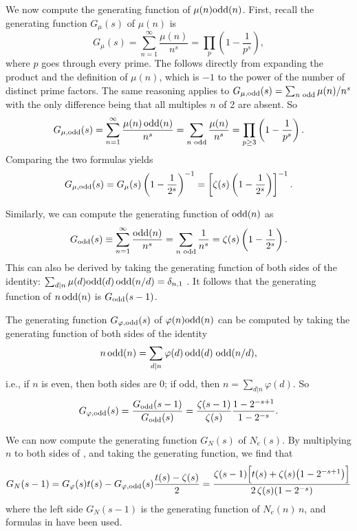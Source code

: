 \documentclass[preprint]{revtex4-1}
\begin{document}
We now compute the generating function of $\mu(n)\mathrm{odd}(n)$.
First, recall the generating function $G_\mu(s)$ of $\mu(n)$ is
\[
  G_\mu(s) = \sum_{n=1}^{\infty} \frac{\mu(n)}{n^s}
  = \prod_p \left( 1 - \frac{1}{p^s} \right),
\]
where $p$ goes through every prime.
%
The follows directly from expanding the product
  and the definition of $\mu(n)$,
which is $-1$ to the power of the number of distinct prime factors.
%
The same reasoning applies to
$G_{\mu, \mathrm{odd}}(s) = \sum_{n \text{ odd}} \mu(n)/n^s$
with the only difference being that all multiples $n$ of 2
are absent. So
%
\[
  G_{\mu, \mathrm{odd}}(s)
  = \sum_{n=1}^{\infty} \frac{\mu(n) \, \mathrm{odd}(n)}{n^s}
  = \sum_{n \text{ odd}} \frac{\mu(n)}{n^s}
  = \prod_{p \ge 3} \left( 1 - \frac{1}{p^s} \right).
\]
Comparing the two formulas yields
\[
  G_{\mu, \mathrm{odd}}(s)
  = G_{\mu}(s)
  \left(1- \frac{1}{2^s}\right)^{-1}
  =
   \left[ \zeta(s) \left(1- \frac{1}{2^s}\right) \right]^{-1}.
\]



Similarly,
we can compute the generating function of $\mathrm{odd}(n)$ as
\[
  G_{\mathrm{odd}}(s)
  \equiv \sum_{n=1}^{\infty} \frac{\mathrm{odd}(n)}{n^s}
  = \sum_{n \text{ odd}} \frac{1}{n^s}
  = \zeta(s) \left(1 - \frac{1}{2^s} \right).
\]
This can also be derived by taking the generating function of
both sides of the identity:
$\sum_{d|n} \mu(d) \mathrm{odd}(d) \, \mathrm{odd}(n/d) = \delta_{n, 1}$
\big[which is a modification of
$\sum_{d|n} \mu(d) = \delta_{n, 1}$\big].
%
It follows that the generating function of $n \, \mathrm{odd}(n)$ is $G_{\mathrm{odd}}(s-1)$.



The generating function $G_{\varphi,\mathrm{odd}}(s)$
of $\varphi(n) \mathrm{odd}(n)$ can be computed by taking the generating function
of both sides of the identity
\[
  n \, \mathrm{odd}(n)  = \sum_{d|n} \varphi(d) \, \mathrm{odd}(d) \; \mathrm{odd}(n/d),
\]
i.e., if $n$ is even, then both sides are 0;
if odd, then $n = \sum_{d|n} \varphi(d)$.
So
\[
  G_{\varphi,\mathrm{odd}}(s) = \frac{G_{\mathrm{odd}}(s-1)}{G_{\mathrm{odd}}(s)}
  = \frac{\zeta(s-1)}{\zeta(s)} \frac{1 - 2^{-s + 1}}{1 - 2^{-s}}.
\]


We can now compute the generating function $G_N(s)$ of $N_e(s)$.
By multiplying $n$ to both sides of ,
and taking the generating function,
we find that
\begin{align*}
  G_N(s - 1)
    = G_\varphi(s) t(s)- G_{\varphi, \mathrm{odd}}(s) \frac{t(s)-\zeta(s)}{2}
    =
      \frac{\zeta(s-1) \Big[ t(s) + \zeta(s) \big( 1  - 2^{-s+1} \big) \Big]  }
           {2 \, \zeta(s) (1 - 2^{-s}) }
\end{align*}
where the left side $G_N(s-1)$ is
  the generating function of $N_e(n) \, n$,
and formulas in  have been used.
\end{document}

